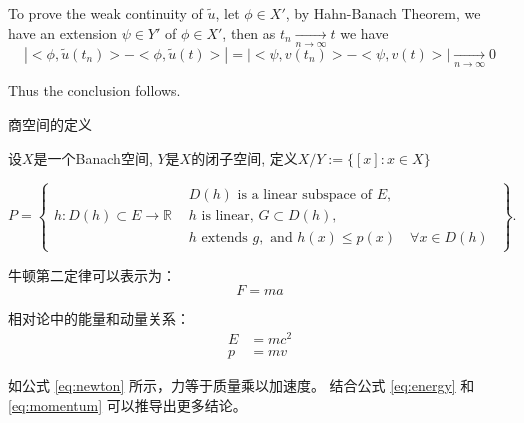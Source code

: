 \documentclass{beamer}
\begin{document}
\begin{frame}
  To prove the weak continuity of $\tilde{u}$, let $\phi \in X'$, by Hahn-Banach Theorem, we have an extension
  $\psi \in Y'$ of $\phi \in X'$, then as $t_n \xrightarrow[n \rightarrow \infty]{} t$ we have 
  {\small
   \begin{equation*}
    |<\phi, \tilde{u}(t_n)>-<\phi, \tilde{u}(t)>|=|<\psi, v(t_n)>-<\psi, v(t)>|\xrightarrow[n \rightarrow \infty]{}0
  \end{equation*}
    }
 

    Thus the conclusion follows.
\end{frame}


\begin{frame}
  
商空间的定义

\begin{definition}
  设$X$是一个Banach空间, $Y$是$X$的闭子空间, 定义$X/Y:=\{[x]:x\in X\}$
\end{definition}


{ \small  \begin{equation}
  P=\left\{\begin{array}{l|l}
h: D(h) \subset E \rightarrow \mathbb{R} & \begin{array}{l}
D(h) \text { is a linear subspace of } E, \\
h \text { is linear, } G \subset D(h), \\
h \text { extends } g, \text { and } h(x) \leq p(x) \quad \forall x \in D(h)
\end{array}
\end{array}\right\} .
\end{equation}
}


\end{frame}


\begin{frame}
  牛顿第二定律可以表示为：
\begin{equation}
    F = ma \label{eq:newton}
\end{equation}

相对论中的能量和动量关系：
\begin{align}
    E &= mc^2 \label{eq:energy} \\
    p &= mv \label{eq:momentum}
\end{align}

如公式 \ref{eq:newton} 所示，力等于质量乘以加速度。
结合公式 \eqref{eq:energy} 和 \eqref{eq:momentum} 可以推导出更多结论。
  

\end{frame}
\end{document}
